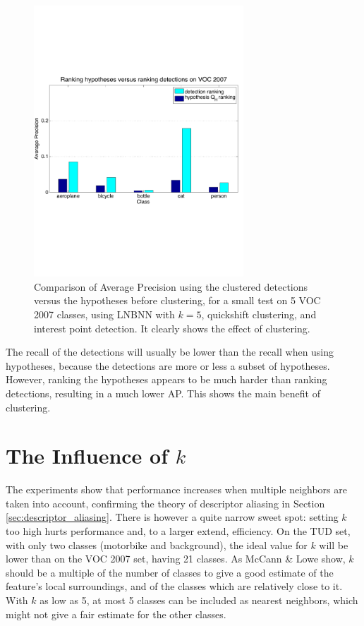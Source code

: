 \begin{figure}[hbt]
    \centering
    \includegraphics[width=0.7\textwidth]{APcomparehypdet}
    \caption{Comparison of Average Precision using the clustered detections versus the hypotheses before clustering, for a small test on 5 VOC 2007 classes, using LNBNN with $k=5$, quickshift clustering, and interest point detection. It clearly shows the effect of clustering.}
    \label{fig:hyprank}
\end{figure}

The recall of the detections will usually be lower than the recall when using hypotheses, because the detections are more or less a subset of hypotheses. However, ranking the hypotheses appears to be much harder than ranking detections, resulting in a much lower AP. This shows the main benefit of clustering.


\section{The Influence of $k$} %
\label{sub:the_influence_of_k_}

The experiments show that performance increases when multiple neighbors are taken into account, confirming the theory of descriptor aliasing in Section \ref{sec:descriptor_aliasing}. There is however a quite narrow sweet spot: setting $k$ too high hurts performance and, to a larger extend, efficiency. On the TUD set, with only two classes (motorbike and background), the ideal value for $k$ will be lower than on the VOC 2007 set, having 21 classes. As McCann \& Lowe \cite{mccann2012local} show, $k$ should be a multiple of the number of classes to give a good estimate of the feature's local surroundings, and of the classes which are relatively close to it. With $k$ as low as 5, at most 5 classes can be included as nearest neighbors, which might not give a fair estimate for the other classes.

